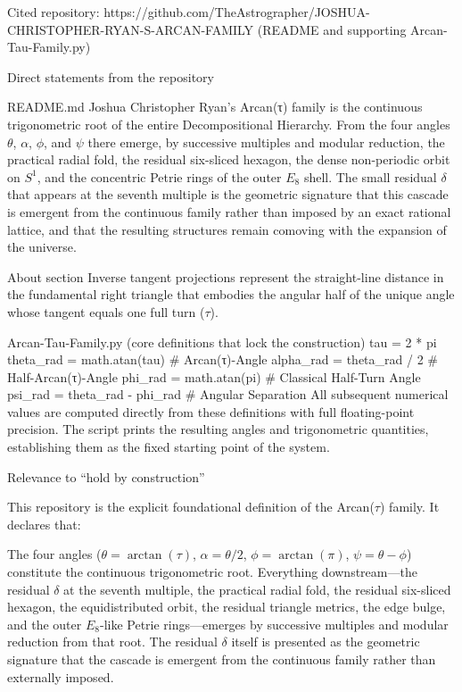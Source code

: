 Cited repository: https://github.com/TheAstrographer/JOSHUA-CHRISTOPHER-RYAN-S-ARCAN-FAMILY  
(README and supporting Arcan-Tau-Family.py)

Direct statements from the repository

README.md  
Joshua Christopher Ryan’s Arcan(τ) family is the continuous trigonometric root of the entire Decompositional Hierarchy. From the four angles \(\theta\), \(\alpha\), \(\phi\), and \(\psi\) there emerge, by successive multiples and modular reduction, the practical radial fold, the residual six-sliced hexagon, the dense non-periodic orbit on \(S^1\), and the concentric Petrie rings of the outer \(E_8\) shell. The small residual \(\delta\) that appears at the seventh multiple is the geometric signature that this cascade is emergent from the continuous family rather than imposed by an exact rational lattice, and that the resulting structures remain comoving with the expansion of the universe.

About section  
Inverse tangent projections represent the straight-line distance in the fundamental right triangle that embodies the angular half of the unique angle whose tangent equals one full turn (\(\tau\)).

Arcan-Tau-Family.py (core definitions that lock the construction)  
tau = 2 * pi
theta_rad = math.atan(tau)          # Arcan(τ)-Angle
alpha_rad = theta_rad / 2           # Half-Arcan(τ)-Angle
phi_rad   = math.atan(pi)           # Classical Half-Turn Angle
psi_rad   = theta_rad - phi_rad     # Angular Separation
All subsequent numerical values are computed directly from these definitions with full floating-point precision. The script prints the resulting angles and trigonometric quantities, establishing them as the fixed starting point of the system.

Relevance to “hold by construction”

This repository is the explicit foundational definition of the Arcan(\(\tau\)) family. It declares that:

The four angles (\(\theta = \arctan(\tau)\), \(\alpha = \theta/2\), \(\phi = \arctan(\pi)\), \(\psi = \theta - \phi\)) constitute the continuous trigonometric root.
Everything downstream—the residual \(\delta\) at the seventh multiple, the practical radial fold, the residual six-sliced hexagon, the equidistributed orbit, the residual triangle metrics, the edge bulge, and the outer \(E_8\)-like Petrie rings—emerges by successive multiples and modular reduction from that root.
The residual \(\delta\) itself is presented as the geometric signature that the cascade is emergent from the continuous family rather than externally imposed.

